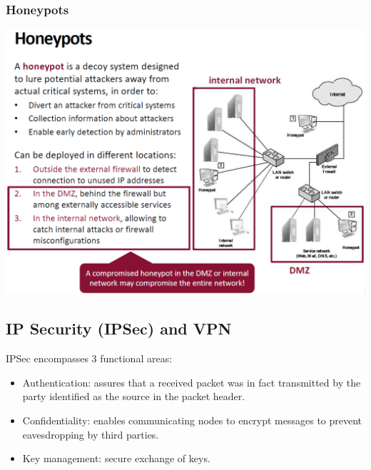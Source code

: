 \documentclass[12pt]{article}
\begin{document}
 \subsubsection{Honeypots}
 \includegraphics[width=\linewidth]{./slides/L6P4HONEY.PNG}
 
 \subsection{IP Security (IPSec) and VPN}
 IPSec encompasses 3 functional areas:
 \begin{itemize}
 	\item Authentication: assures that a received packet was in fact transmitted by the party identified as the source in the packet header.
 	\item Confidentiality: enables communicating nodes to encrypt messages to prevent eavesdropping by third parties.
 	\item Key management: secure exchange of keys.
 \end{itemize}
 
\end{document}
